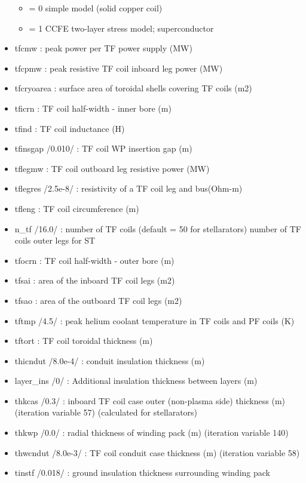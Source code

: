 \documentclass[]{article}
\providecommand{\tightlist}{%
  \setlength{\itemsep}{0pt}\setlength{\parskip}{0pt}}
\begin{document}
\begin{itemize}
  \begin{itemize}
  \tightlist
  \item
    = 0 simple model (solid copper coil)
  \item
    = 1 CCFE two-layer stress model; superconductor
  \end{itemize}
\item
  tfcmw : peak power per TF power supply (MW)
\item
  tfcpmw : peak resistive TF coil inboard leg power (MW)
\item
  tfcryoarea : surface area of toroidal shells covering TF coils (m2)
\item
  tficrn : TF coil half-width - inner bore (m)
\item
  tfind : TF coil inductance (H)
\item
  tfinsgap /0.010/ : TF coil WP insertion gap (m)
\item
  tflegmw : TF coil outboard leg resistive power (MW)
\item
  tflegres /2.5e-8/ : resistivity of a TF coil leg and bus(Ohm-m)
\item
  tfleng : TF coil circumference (m)
\item
  n_tf /16.0/ : number of TF coils (default = 50 for stellarators)
  number of TF coils outer legs for ST
\item
  tfocrn : TF coil half-width - outer bore (m)
\item
  tfsai : area of the inboard TF coil legs (m2)
\item
  tfsao : area of the outboard TF coil legs (m2)
\item
  tftmp /4.5/ : peak helium coolant temperature in TF coils and PF coils
  (K)
\item
  tftort : TF coil toroidal thickness (m)
\item
  thicndut /8.0e-4/ : conduit insulation thickness (m)
\item
  layer\_ins /0/ : Additional insulation thickness between layers (m)
\item
  thkcas /0.3/ : inboard TF coil case outer (non-plasma side) thickness
  (m) (iteration variable 57) (calculated for stellarators)
\item
  thkwp /0.0/ : radial thickness of winding pack (m) (iteration variable
  140)
\item
  thwcndut /8.0e-3/ : TF coil conduit case thickness (m) (iteration
  variable 58)
\item
  tinstf /0.018/ : ground insulation thickness surrounding winding pack

\end{itemize}
\end{document}
